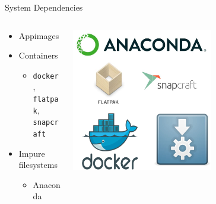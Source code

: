 \documentclass[bigger,unknownkeysallowed,aspectratio=169,red,colorblocks]{beamer}
\begin{document}
\begin{frame}[label={sec:org67540f1},fragile]{System Dependencies}
 \begin{columns}
\begin{column}{0.5\columnwidth}
\begin{itemize}
\item Appimages
\item Containers
\begin{itemize}
\item \texttt{docker}, \texttt{flatpak}, \texttt{snapcraft}
\end{itemize}
\item Impure filesystems
\begin{itemize}
\item Anaconda
\end{itemize}
\end{itemize}
\end{column}
\begin{column}{0.5\columnwidth}
\begin{center}
\includegraphics[width=0.6\textwidth]{images/System_Dependencies/2020-09-20_05-23-11_screenshot.png}
\end{center}
\end{column}
\end{columns}
\end{frame}
\end{document}
